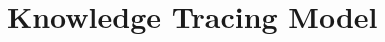 \documentclass{edm_template}
\begin{document}




\section{Knowledge Tracing Model}


\end{document}
